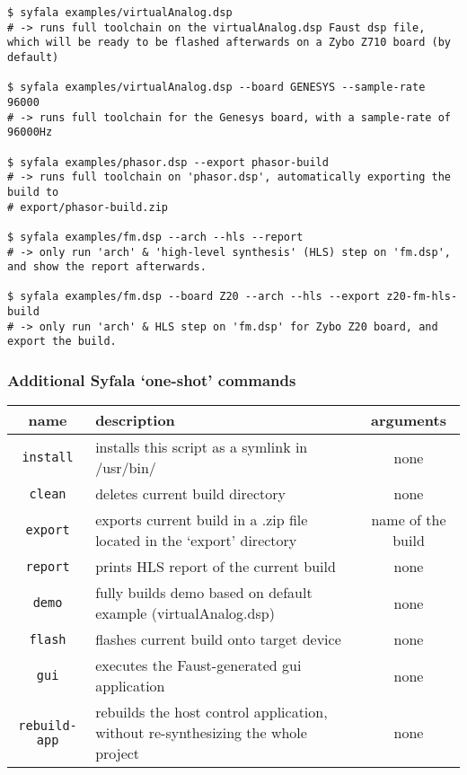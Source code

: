 \begin{lstlisting}
$ syfala examples/virtualAnalog.dsp
# -> runs full toolchain on the virtualAnalog.dsp Faust dsp file, which will be ready to be flashed afterwards on a Zybo Z710 board (by default)

$ syfala examples/virtualAnalog.dsp --board GENESYS --sample-rate 96000
# -> runs full toolchain for the Genesys board, with a sample-rate of 96000Hz

$ syfala examples/phasor.dsp --export phasor-build
# -> runs full toolchain on 'phasor.dsp', automatically exporting the build to 
# export/phasor-build.zip

$ syfala examples/fm.dsp --arch --hls --report
# -> only run 'arch' & 'high-level synthesis' (HLS) step on 'fm.dsp', and show the report afterwards.

$ syfala examples/fm.dsp --board Z20 --arch --hls --export z20-fm-hls-build
# -> only run 'arch' & HLS step on 'fm.dsp' for Zybo Z20 board, and export the build.
\end{lstlisting}

\subsubsection{Additional Syfala `one-shot' commands}

\begin{tabular}{|c|p{9cm}|c|}
  \toprule
  name & description & arguments \\
\midrule
\texttt{install} & installs this script as a symlink in /usr/bin/ &
none \\
\texttt{clean} & deletes current build directory & none \\
\texttt{export} & exports current build in a .zip file located in the
`export' directory & name of the build \\
\texttt{report} & prints HLS report of the current build & none \\
\texttt{demo} & fully builds demo based on default example
(virtualAnalog.dsp) & none \\
\texttt{flash} & flashes current build onto target device & none \\
\texttt{gui} & executes the Faust-generated gui application & none \\
\texttt{rebuild-app} & rebuilds the host control application, without
re-synthesizing the whole project & none \\
\bottomrule
\end{tabular}

